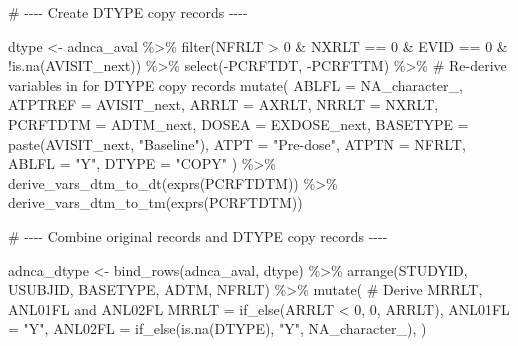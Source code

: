 \documentclass[
  letterpaper,
  DIV=11,
  numbers=noendperiod]{scrreprt}
\newenvironment{Shaded}{\begin{snugshade}}{\end{snugshade}}
\newcommand{\AttributeTok}[1]{\textcolor[rgb]{0.40,0.45,0.13}{#1}}
\newcommand{\CommentTok}[1]{\textcolor[rgb]{0.37,0.37,0.37}{#1}}
\newcommand{\ConstantTok}[1]{\textcolor[rgb]{0.56,0.35,0.01}{#1}}
\newcommand{\DecValTok}[1]{\textcolor[rgb]{0.68,0.00,0.00}{#1}}
\newcommand{\FunctionTok}[1]{\textcolor[rgb]{0.28,0.35,0.67}{#1}}
\newcommand{\NormalTok}[1]{\textcolor[rgb]{0.00,0.23,0.31}{#1}}
\newcommand{\OtherTok}[1]{\textcolor[rgb]{0.00,0.23,0.31}{#1}}
\newcommand{\SpecialCharTok}[1]{\textcolor[rgb]{0.37,0.37,0.37}{#1}}
\newcommand{\StringTok}[1]{\textcolor[rgb]{0.13,0.47,0.30}{#1}}
\begin{document}
\begin{Shaded}
\begin{Highlighting}[]
\CommentTok{\# {-}{-}{-}{-} Create DTYPE copy records {-}{-}{-}{-}}

\NormalTok{dtype }\OtherTok{\textless{}{-}}\NormalTok{ adnca\_aval }\SpecialCharTok{\%\textgreater{}\%}
  \FunctionTok{filter}\NormalTok{(NFRLT }\SpecialCharTok{\textgreater{}} \DecValTok{0} \SpecialCharTok{\&}\NormalTok{ NXRLT }\SpecialCharTok{==} \DecValTok{0} \SpecialCharTok{\&}\NormalTok{ EVID }\SpecialCharTok{==} \DecValTok{0} \SpecialCharTok{\&} \SpecialCharTok{!}\FunctionTok{is.na}\NormalTok{(AVISIT\_next)) }\SpecialCharTok{\%\textgreater{}\%}
  \FunctionTok{select}\NormalTok{(}\SpecialCharTok{{-}}\NormalTok{PCRFTDT, }\SpecialCharTok{{-}}\NormalTok{PCRFTTM) }\SpecialCharTok{\%\textgreater{}\%}
  \CommentTok{\# Re{-}derive variables in for DTYPE copy records}
  \FunctionTok{mutate}\NormalTok{(}
    \AttributeTok{ABLFL =} \ConstantTok{NA\_character\_}\NormalTok{,}
    \AttributeTok{ATPTREF =}\NormalTok{ AVISIT\_next,}
    \AttributeTok{ARRLT =}\NormalTok{ AXRLT,}
    \AttributeTok{NRRLT =}\NormalTok{ NXRLT,}
    \AttributeTok{PCRFTDTM =}\NormalTok{ ADTM\_next,}
    \AttributeTok{DOSEA =}\NormalTok{ EXDOSE\_next,}
    \AttributeTok{BASETYPE =} \FunctionTok{paste}\NormalTok{(AVISIT\_next, }\StringTok{"Baseline"}\NormalTok{),}
    \AttributeTok{ATPT =} \StringTok{"Pre{-}dose"}\NormalTok{,}
    \AttributeTok{ATPTN =}\NormalTok{ NFRLT,}
    \AttributeTok{ABLFL =} \StringTok{"Y"}\NormalTok{,}
    \AttributeTok{DTYPE =} \StringTok{"COPY"}
\NormalTok{  ) }\SpecialCharTok{\%\textgreater{}\%}
  \FunctionTok{derive\_vars\_dtm\_to\_dt}\NormalTok{(}\FunctionTok{exprs}\NormalTok{(PCRFTDTM)) }\SpecialCharTok{\%\textgreater{}\%}
  \FunctionTok{derive\_vars\_dtm\_to\_tm}\NormalTok{(}\FunctionTok{exprs}\NormalTok{(PCRFTDTM))}

\CommentTok{\# {-}{-}{-}{-} Combine original records and DTYPE copy records {-}{-}{-}{-}}

\NormalTok{adnca\_dtype }\OtherTok{\textless{}{-}} \FunctionTok{bind\_rows}\NormalTok{(adnca\_aval, dtype) }\SpecialCharTok{\%\textgreater{}\%}
  \FunctionTok{arrange}\NormalTok{(STUDYID, USUBJID, BASETYPE, ADTM, NFRLT) }\SpecialCharTok{\%\textgreater{}\%}
  \FunctionTok{mutate}\NormalTok{(}
    \CommentTok{\# Derive MRRLT, ANL01FL and ANL02FL}
    \AttributeTok{MRRLT =} \FunctionTok{if\_else}\NormalTok{(ARRLT }\SpecialCharTok{\textless{}} \DecValTok{0}\NormalTok{, }\DecValTok{0}\NormalTok{, ARRLT),}
    \AttributeTok{ANL01FL =} \StringTok{"Y"}\NormalTok{,}
    \AttributeTok{ANL02FL =} \FunctionTok{if\_else}\NormalTok{(}\FunctionTok{is.na}\NormalTok{(DTYPE), }\StringTok{"Y"}\NormalTok{, }\ConstantTok{NA\_character\_}\NormalTok{),}
\NormalTok{  )}


\end{Highlighting}
\end{Shaded}
\end{document}

